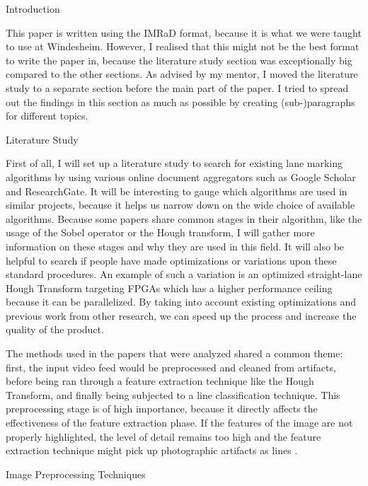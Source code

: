 \documentclass{matthijs}
\begin{document}
\begin{hoofdstuk}{Introduction}
		\bigskip

		This paper is written using the IMRaD format, because it is what we were taught to use at Windesheim.
		However, I realised that this might not be the best format to write the paper in, because the literature study section was exceptionally big compared to the other sections.
		As advised by my mentor, I moved the literature study to a separate section before the main part of the paper.
		I tried to spread out the findings in this section as much as possible by creating (sub-)paragraphs for different topics.

	\end{hoofdstuk}
	
	\begin{hoofdstuk}{Literature Study}

		First of all, I will set up a literature study to search for existing lane marking algorithms by using various online document aggregators such as Google Scholar and ResearchGate.
		It will be interesting to gauge which algorithms are used in similar projects, because it helps us narrow down on the wide choice of available algorithms.
		Because some papers share common stages in their algorithm, like the usage of the Sobel operator or the Hough transform, I will gather more information on these stages and why they are used in this field.
		It will also be helpful to search if people have made optimizations or variations upon these standard procedures.
		An example of such a variation is an optimized straight-lane Hough Transform targeting FPGAs \cite{el2020novel} which has a higher performance ceiling because it can be parallelized.
		By taking into account existing optimizations and previous work from other research, we can speed up the process and increase the quality of the product.

		\bigskip

		The methods used in the papers that were analyzed shared a common theme: first, the input video feed would be preprocessed and cleaned from artifacts, before being ran through a feature extraction technique like the Hough Transform, and finally being subjected to a line classification technique.
		This preprocessing stage is of high importance, because it directly affects the effectiveness of the feature extraction phase.
		If the features of the image are not properly highlighted, the level of detail remains too high and the feature extraction technique might pick up photographic artifacts as lines \cite{felix2003low}.

		\begin{paragraaf}{Image Preprocessing Techniques}


\end{paragraaf}
\end{hoofdstuk}
\end{document}

